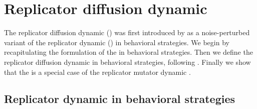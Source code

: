 \section{Replicator diffusion dynamic}

The replicator diffusion dynamic (\rdd) was first introduced by
\citet{Correia2013:The-Bivalent-Tr} as a noise-perturbed variant of
the replicator dynamic (\rd) in behavioral strategies. We begin by
recapitulating the formulation of the \rd in behavioral
strategies. Then we define the replicator diffusion dynamic in
behavioral strategies, following \citet{Correia2013:The-Bivalent-Tr}.
Finally we show that the \rdd is a special case of the replicator
mutator dynamic \citep[e.g.][]{Nowak2006:Evolutionary-Dy}.

\subsection{Replicator dynamic in behavioral strategies}

